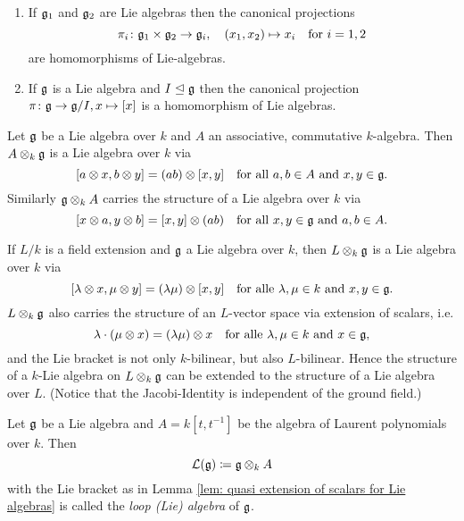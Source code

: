 \begin{lem}
 \begin{enumerate}[leftmargin=*]
  \item
   If $\mathfrak{g}_1$ and $\mathfrak{g}_2$ are Lie algebras then the canonical projections
   \[
    \pi_i \colon \mathfrak{g}_1 \times \mathfrak{g}_2 \to \mathfrak{g}_i, \quad (x_1, x_2) \mapsto x_i
    \quad \text{for $i = 1, 2$}
   \]
   are homomorphisms of Lie-algebras.
  \item
   If $\mathfrak{g}$ is a Lie algebra and $I \trianglelefteq \mathfrak{g}$ then the canonical projection $\pi \colon \mathfrak{g} \to \mathfrak{g}/I, x \mapsto [x]$ is a homomorphism of Lie algebras.
 \end{enumerate}
\end{lem}



\begin{lem}\label{lem: quasi extension of scalars for Lie algebras}
Let $\mathfrak{g}$ be a Lie algebra over $k$ and $A$ an associative, commutative $k$-algebra. Then $A \otimes_k \mathfrak{g}$ is a Lie algebra over $k$ via
\[
 [a \otimes x, b \otimes y] = (ab) \otimes [x,y]
 \quad
 \text{for all $a,b \in A$ and $x,y \in \mathfrak{g}$}.
\]
Similarly $\mathfrak{g} \otimes_k A$ carries the structure of a Lie algebra over $k$ via
\[
 [x \otimes a, y \otimes b] = [x,y] \otimes (ab)
 \quad
 \text{for all $x,y \in \mathfrak{g}$ and $a,b \in A$}.
\]
\end{lem}


\begin{expl}
 If $L/k$ is a field extension and $\mathfrak{g}$ a Lie algebra over $k$, then $L \otimes_k \mathfrak{g}$ is a Lie algebra over $k$ via
 \[
  [\lambda \otimes x, \mu \otimes y] = (\lambda \mu) \otimes [x,y]
  \quad
  \text{for alle $\lambda, \mu \in k$ and $x,y \in \mathfrak{g}$}.
 \]
 $L \otimes_k \mathfrak{g}$ also carries the structure of an $L$-vector space via extension of scalars, i.e.
 \[
  \lambda \cdot (\mu \otimes x) = (\lambda \mu) \otimes x
  \quad
  \text{for alle $\lambda, \mu \in k$ and $x \in \mathfrak{g}$},
 \]
 and the Lie bracket is not only $k$-bilinear, but also $L$-bilinear. Hence the structure of a $k$-Lie algebra on $L \otimes_k \mathfrak{g}$ can be extended to the structure of a Lie algebra over $L$. (Notice that the Jacobi-Identity is independent of the ground field.)
\end{expl}


\begin{defi}
 Let $\mathfrak{g}$ be a Lie algebra and $A = k[t,t^{-1}]$ be the algebra of Laurent polynomials over $k$. Then
 \[
  \mathcal{L}(\mathfrak{g}) \coloneqq \mathfrak{g} \otimes_k A
 \]
 with the Lie bracket as in Lemma \ref{lem: quasi extension of scalars for Lie algebras} is called the \emph{loop (Lie) algebra} of $\mathfrak{g}$.
\end{defi}


